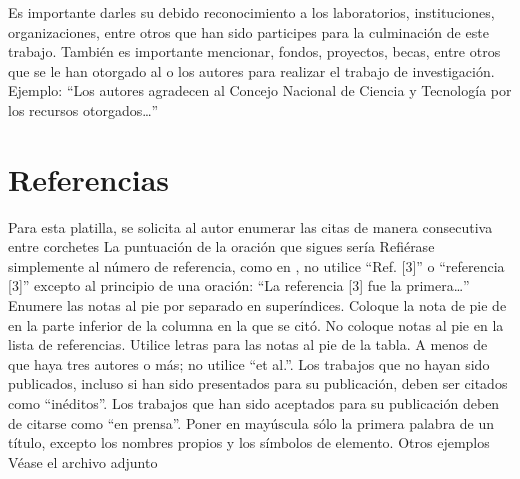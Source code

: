     Es importante darles su debido reconocimiento a los laboratorios, instituciones, organizaciones, entre otros que han sido participes para la culminación de este trabajo. También es importante mencionar, fondos, proyectos, becas, entre otros que se le han otorgado al o los autores para realizar el trabajo de investigación. Ejemplo: “Los autores agradecen al Concejo Nacional de Ciencia y Tecnología por los recursos otorgados…”
    
    \section*{Referencias}
    Para esta platilla, se solicita al autor enumerar las citas de manera consecutiva entre corchetes 
    La puntuación de la oración que sigues sería  
    Refiérase simplemente al número de referencia, como en , no utilice “Ref. [3]” o “referencia [3]” excepto al principio de una oración: “La referencia [3] fue la primera…”
    Enumere las notas al pie por separado en superíndices. Coloque la nota de pie de en la parte inferior de la columna en la que se citó. No coloque notas al pie en la lista de referencias. Utilice letras para las notas al pie de la tabla.
    A menos de que haya tres autores o más; no utilice “et al.”. Los trabajos que no hayan sido publicados, incluso si han sido presentados para su publicación, deben ser citados como “inéditos”. Los trabajos que han sido aceptados para su publicación deben de citarse como “en prensa”. Poner en mayúscula sólo la primera palabra de un título, excepto los nombres propios y los símbolos de elemento. 
    Otros ejemplos 
    Véase el archivo adjunto 
    
    
    
    
